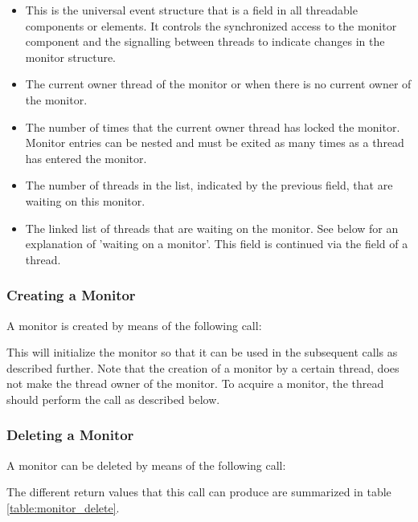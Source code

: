 \begin{itemize}
\item {} This is the universal event structure that is a field
in all threadable components or elements. It controls the synchronized access
to the monitor component and the signalling between threads to indicate changes
in the monitor structure.
\item {} The current owner thread of the monitor
or  when there is no current owner of the monitor.
\item {} The number of times that the
current owner thread has locked the monitor. Monitor entries can be nested
and must be exited as many times as a thread has entered the monitor.
\item {} The number of threads in
the list, indicated by the previous field, that are waiting on this monitor.
\item {} The linked list of threads
that are waiting on the monitor. See below for an explanation of 'waiting on
a monitor'. This field is continued via the
 field of a thread.
\end{itemize}

\subsubsection{Creating a Monitor}

A monitor is created by means of the following call:


This will initialize the monitor so that it can be used in the subsequent
calls as described further. Note that the creation of a monitor by a certain
thread, does not make the thread owner of the monitor. To acquire a monitor,
the thread should perform the  call as described
below.

\subsubsection{Deleting a Monitor}

A monitor can be deleted by means of the following call:


The different return values that this call can produce are summarized
in table \ref{table:monitor_delete}.  


